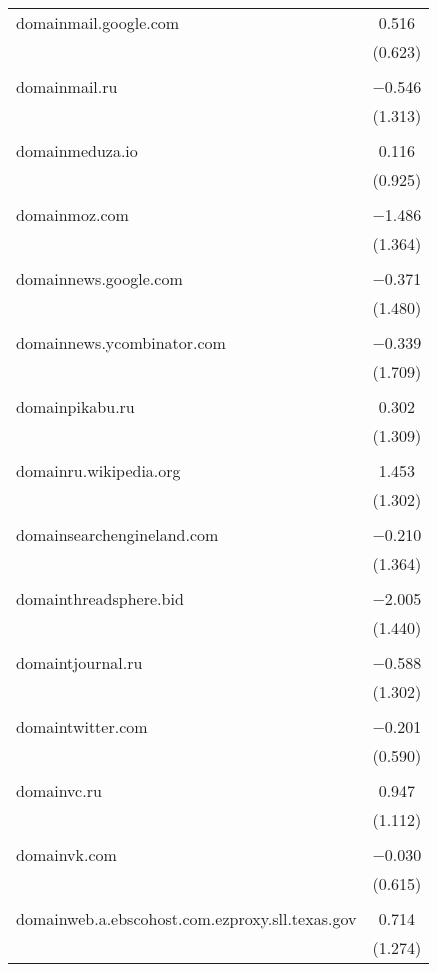 \begin{table}[!htbp]
\begin{tabular}{@{\extracolsep{5pt}}lc}
 domainmail.google.com & 0.516 \\ 
  & (0.623) \\ 
  & \\ 
 domainmail.ru & $-$0.546 \\ 
  & (1.313) \\ 
  & \\ 
 domainmeduza.io & 0.116 \\ 
  & (0.925) \\ 
  & \\ 
 domainmoz.com & $-$1.486 \\ 
  & (1.364) \\ 
  & \\ 
 domainnews.google.com & $-$0.371 \\ 
  & (1.480) \\ 
  & \\ 
 domainnews.ycombinator.com & $-$0.339 \\ 
  & (1.709) \\ 
  & \\ 
 domainpikabu.ru & 0.302 \\ 
  & (1.309) \\ 
  & \\ 
 domainru.wikipedia.org & 1.453 \\ 
  & (1.302) \\ 
  & \\ 
 domainsearchengineland.com & $-$0.210 \\ 
  & (1.364) \\ 
  & \\ 
 domainthreadsphere.bid & $-$2.005 \\ 
  & (1.440) \\ 
  & \\ 
 domaintjournal.ru & $-$0.588 \\ 
  & (1.302) \\ 
  & \\ 
 domaintwitter.com & $-$0.201 \\ 
  & (0.590) \\ 
  & \\ 
 domainvc.ru & 0.947 \\ 
  & (1.112) \\ 
  & \\ 
 domainvk.com & $-$0.030 \\ 
  & (0.615) \\ 
  & \\ 
 domainweb.a.ebscohost.com.ezproxy.sll.texas.gov & 0.714 \\ 
  & (1.274) \\ 

\end{tabular}
\end{table}
